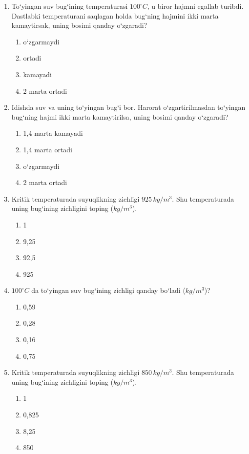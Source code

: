 \begin{enumerate}
\item To‘yingan suv bug‘ining temperaturasi $100^\circ C$, u biror hajmni egallab turibdi. Dastlabki temperaturani saqlagan holda bug‘ning hajmini ikki marta kamaytirsak, uning bosimi qanday o‘zgaradi?
\begin{enumerate}[label=\Alph*)]
\item o‘zgarmaydi
\item ortadi
\item kamayadi
\item 2 marta ortadi
\end{enumerate}

\item Idishda suv va uning to‘yingan bug‘i bor. Harorat o‘zgartirilmasdan to‘yingan bug‘ning hajmi ikki marta kamaytirilsa, uning bosimi qanday o‘zgaradi?
\begin{enumerate}[label=\Alph*)]
\item 1,4 marta kamayadi
\item 1,4 marta ortadi
\item o‘zgarmaydi
\item 2 marta ortadi
\end{enumerate}

\item Kritik temperaturada suyuqlikning zichligi $925 \, kg/m^3$. Shu temperaturada uning bug‘ining zichligini toping ($kg/m^3$).
\begin{enumerate}[label=\Alph*)]
\item 1
\item 9,25
\item 92,5
\item 925
\end{enumerate}

\item $100^\circ C$ da to‘yingan suv bug‘ining zichligi qanday bo‘ladi ($kg/m^3$)?
\begin{enumerate}[label=\Alph*)]
\item 0,59
\item 0,28
\item 0,16
\item 0,75
\end{enumerate}

\item Kritik temperaturada suyuqlikning zichligi $850 \, kg/m^3$. Shu temperaturada uning bug‘ining zichligini toping ($kg/m^3$).
\begin{enumerate}[label=\Alph*)]
\item 1
\item 0,825
\item 8,25
\item 850
\end{enumerate}


\end{enumerate}
